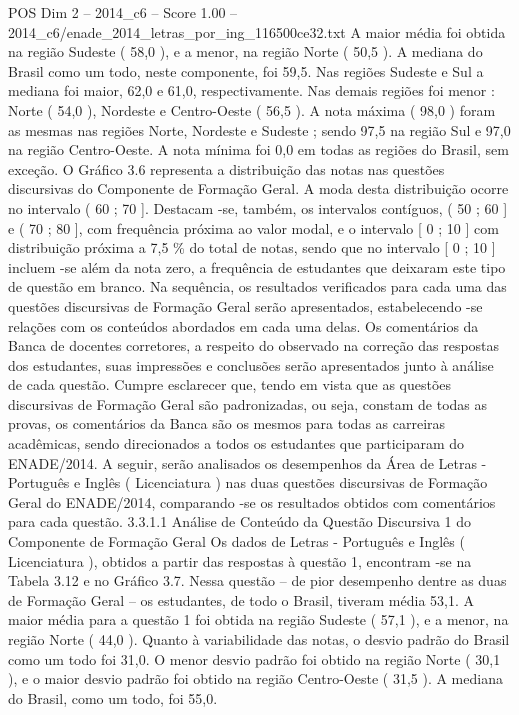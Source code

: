 \begin{textsample}{POS Dim 2 – 2014\_c6 – Score 1.00 – 2014\_c6/enade\_2014\_letras\_por\_ing\_116500ce32.txt}
A maior média foi obtida na região Sudeste ( 58,0 ), e a menor, na região Norte ( 50,5 ).
A mediana do Brasil como um todo, neste componente, foi 59,5.
Nas regiões Sudeste e Sul a mediana foi maior, 62,0 e 61,0, respectivamente.
Nas demais regiões foi menor : Norte ( 54,0 ), Nordeste e Centro-Oeste ( 56,5 ).
A nota máxima ( 98,0 ) foram as mesmas nas regiões Norte, Nordeste e Sudeste ; sendo 97,5 na região Sul e 97,0 na região Centro-Oeste.
A nota mínima foi 0,0 em todas as regiões do Brasil, sem exceção.
O Gráfico 3.6 representa a distribuição das notas nas questões discursivas do Componente de Formação Geral.
A moda desta distribuição ocorre no intervalo ( 60 ; 70 ].
Destacam -se, também, os intervalos contíguos, ( 50 ; 60 ] e ( 70 ; 80 ], com frequência próxima ao valor modal, e o intervalo [ 0 ; 10 ] com distribuição próxima a 7,5 \% do total de notas, sendo que no intervalo [ 0 ; 10 ] incluem -se além da nota zero, a frequência de estudantes que deixaram este tipo de questão em branco.
Na sequência, os resultados verificados para cada uma das questões discursivas de Formação Geral serão apresentados, estabelecendo -se relações com os conteúdos abordados em cada uma delas.
Os comentários da Banca de docentes corretores, a respeito do observado na correção das respostas dos estudantes, suas impressões e conclusões serão apresentados junto à análise de cada questão.
Cumpre esclarecer que, tendo em vista que as questões discursivas de Formação Geral são padronizadas, ou seja, constam de todas as provas, os comentários da Banca são os mesmos para todas as carreiras acadêmicas, sendo direcionados a todos os estudantes que participaram do ENADE/2014.
A seguir, serão analisados os desempenhos da Área de Letras - Português e Inglês ( Licenciatura ) nas duas questões discursivas de Formação Geral do ENADE/2014, comparando -se os resultados obtidos com comentários para cada questão. 3.3.1.1 Análise de Conteúdo da Questão Discursiva 1 do Componente de Formação Geral Os dados de Letras - Português e Inglês ( Licenciatura ), obtidos a partir das respostas à questão 1, encontram -se na Tabela 3.12 e no Gráfico 3.7.
Nessa questão – de pior desempenho dentre as duas de Formação Geral – os estudantes, de todo o Brasil, tiveram média 53,1.
A maior média para a questão 1 foi obtida na região Sudeste ( 57,1 ), e a menor, na região Norte ( 44,0 ).
Quanto à variabilidade das notas, o desvio padrão do Brasil como um todo foi 31,0.
O menor desvio padrão foi obtido na região Norte ( 30,1 ), e o maior desvio padrão foi obtido na região Centro-Oeste ( 31,5 ).
A mediana do Brasil, como um todo, foi 55,0.

\end{textsample}
